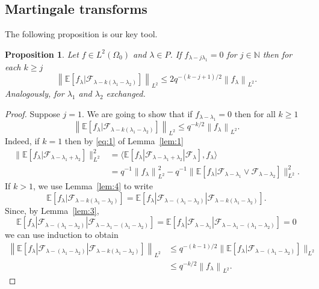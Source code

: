 \documentclass[a4paper]{amsart}
\newcommand{\sprod}[2]{{\langle #1, #2\rangle}}
\newcommand{\norm}[1]{{\left\lVert #1 \right\rVert}}
\newcommand{\EE}{\mathbb{E}}
\newcommand{\NN}{\mathbb{N}}
\theoremstyle{plain}
\newtheorem{proposition}{Proposition}[section]
\theoremstyle{definition}
\theoremstyle{remark}
\numberwithin{equation}{section}
\theoremstyle{plain}
\begin{document}
\subsection{Martingale transforms}
The following proposition is our key tool.
\begin{proposition}
	\label{prop:1}
	Let $f \in L^2(\Omega_0)$ and $\lambda \in P$. If $f_{\lambda - j \lambda_1} = 0$
	for $j \in \NN$ then for each $k \geq j$
	$$
	\norm{\EE[f_\lambda | \mathcal{F}_{\lambda-k(\lambda_1-\lambda_2)}]}_{L^2} 
	\leq 2 q^{-(k-j+1)/2}\norm{f_\lambda}_{L^2}.
	$$
	Analogously, for $\lambda_1$ and $\lambda_2$ exchanged.
\end{proposition}
\begin{proof}
	Suppose $j = 1$. We are going to show that if $f_{\lambda - \lambda_1} = 0$ then for all $k \geq 1$
	\begin{equation}
		\label{eq:2}
		\norm{\EE[f_\lambda | \mathcal{F}_{\lambda - k(\lambda_1 - \lambda_2)} ]}_{L^2}
		\leq
		q^{-k/2}
		\norm{f_\lambda}_{L^2}.
	\end{equation}
	Indeed, if $k = 1$ then by \eqref{eq:1} of Lemma~\ref{lem:1}
	\begin{align*}
	\big\lVert \EE[f_\lambda|\mathcal{F}_{\lambda-\lambda_1+\lambda_2}] \big\rVert_{L^2}^2
	& =\sprod{\EE[f_\lambda | \mathcal{F}_{\lambda-\lambda_1+\lambda_2} 
	| \mathcal{F}_\lambda]}{f_\lambda} \\
	& = q^{-1} \norm{f_\lambda}^2_{L^2} 
	- q^{-1} \big\lVert \EE[f_\lambda | \mathcal{F}_{\lambda-\lambda_1} \vee 
	\mathcal{F}_{\lambda-\lambda_2}] \big\rVert_{L^2}^2.
	\end{align*}
	If $k > 1$, we use Lemma~\ref{lem:4} to write
	$$
	\EE[f_\lambda | \mathcal{F}_{\lambda-k(\lambda_1-\lambda_2)}] 
	= \EE[f_\lambda |\mathcal{F}_{\lambda-(\lambda_1-\lambda_2)} 
	| \mathcal{F}_{\lambda-k(\lambda_1-\lambda_2)}].
	$$
	Since, by Lemma~\ref{lem:3},
	$$
	\EE[f_\lambda | \mathcal{F}_{\lambda-(\lambda_1-\lambda_2)} 
	| \mathcal{F}_{\lambda-\lambda_1 - (\lambda_1 - \lambda_2)}] 
	= \EE[f_\lambda | \mathcal{F}_{\lambda-\lambda_1} | 
	\mathcal{F}_{\lambda-\lambda_1- (\lambda_1 - \lambda_2)}] = 0
	$$
	we can use induction to obtain
	\begin{align*}
	\norm{\EE[f_\lambda | \mathcal{F}_{\lambda-(\lambda_1-\lambda_2)} 
	| \mathcal{F}_{\lambda-k(\lambda_1-\lambda_2)}]}_{L^2} 
	& \leq q^{-(k-1)/2} 
	\big\lVert \EE[f_\lambda | \mathcal{F}_{\lambda-(\lambda_1-\lambda_2)}] \big\rVert_{L^2}  \\
	& \leq q^{-k/2} \norm{f_\lambda}_{L^2}.
	\end{align*}

\end{proof}
\end{document}
